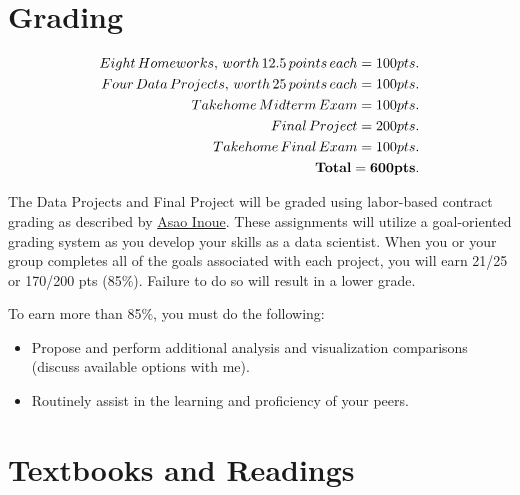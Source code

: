 \documentclass[11pt]{article} %
\begin{document}
\section{Grading}

  \begin{align*}
    Eight \, Homeworks, \, worth \, 12.5 \, points \, each = 100 pts.\\
    Four \, Data \, Projects, \, worth \, 25 \, points \, each = 100 pts.\\
    Takehome \, Midterm \, Exam = 100 pts.\\
    Final \, Project = 200 pts.\\
    Takehome \, Final \, Exam = 100 pts.\\
    {\bf Total = 600 pts.}
  \end{align*}

  The Data Projects and Final Project will be graded using labor-based contract grading as described by \href{http://www.translingualwriting.com/resources/Inoue\%20Contract.pdf}{Asao Inoue}. These assignments will utilize a goal-oriented grading system as you develop your skills as a data scientist.  When you or your group completes all of the goals associated with each project, you will earn 21/25 or 170/200 pts (85\%). Failure to do so will result in a lower grade.

To earn more than 85\%, you must do the following:
\begin{itemize}
  \item Propose and perform additional analysis and visualization comparisons (discuss available options with me).
  \item Routinely assist in the learning and proficiency of your peers.
\end{itemize}


\section{Textbooks and Readings}
\end{document}
